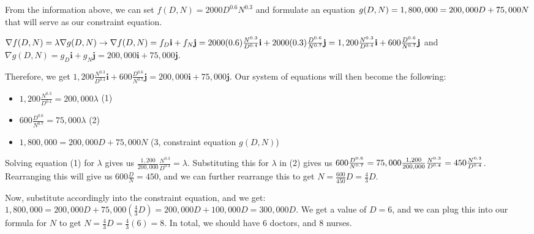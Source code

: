 \documentclass{article}
\begin{document}
\par\noindent\large From the information above, we can set $f(D, N) = 2000D^{0.6}N^{0.3}$ and formulate an equation $\linebreak g(D, N) = 1,800,000 = 200,000D + 75,000N$ that will serve as our constraint equation.\vspace{0.25cm}

\par\noindent\large $\nabla f(D, N) = \lambda\nabla g(D, N) \rightarrow \nabla f(D, N) = f_{D}\textbf{i} + f_{N}\textbf{j} = 2000(0.6)\frac{N^{0.3}}{D^{0.4}}\textbf{i} + 2000(0.3)\frac{D^{0.6}}{N^{0.7}}\textbf{j} =\linebreak 1,200\frac{N^{0.3}}{D^{0.4}}\textbf{i} + 600\frac{D^{0.6}}{N^{0.7}}\textbf{j}$ and $\nabla g(D, N) = g_{D}\textbf{i} + g_{N}\textbf{j} = 200,000\textbf{i} + 75,000\textbf{j}$.\vspace{0.25cm}

\par\noindent\large Therefore, we get $1,200\frac{N^{0.3}}{D^{0.4}}\textbf{i} + 600\frac{D^{0.6}}{N^{0.7}}\textbf{j} = 200,000\textbf{i} + 75,000\textbf{j}$.  Our system of equations will then become the following:

\begin{itemize}
   \item  $1,200\frac{N^{0.3}}{D^{0.4}} = 200,000\lambda$ (1)
   \item $600\frac{D^{0.6}}{N^{0.7}} = 75,000\lambda$ (2)
   \item $1,800,000 = 200,000D + 75,000N$ (3, constraint equation $g(D, N)$)
 \end{itemize}
 
\par\noindent\large Solving equation (1) for $\lambda$ gives us $\frac{1,200}{200,000}\frac{N^{0.3}}{D^{0.4}} = \lambda$.  Substituting this for $\lambda$ in (2) gives us $\linebreak 600\frac{D^{0.6}}{N^{0.7}} = 75,000\frac{1,200}{200,000}\frac{N^{0.3}}{D^{0.4}} = 450\frac{N^{0.3}}{D^{0.4}}$.  Rearranging this will give us $600\frac{D}{N} = 450$, and we can further rearrange this to get $N = \frac{600}{450}D = \frac{4}{3}D$.\vspace{0.25cm}
 
\par\noindent\large Now, substitute accordingly into the constraint equation, and we get: $1,800,000 = 200,000D + 75,000(\frac{4}{3}D) = 200,000D + 100,000D = 300,000D$.  We get a value of $D = 6$, and we can plug this into our formula for $N$ to get $N = \frac{4}{3}D = \frac{4}{3}(6) = 8$.  In total, we should have 6 doctors, and 8 nurses.
\end{document}
